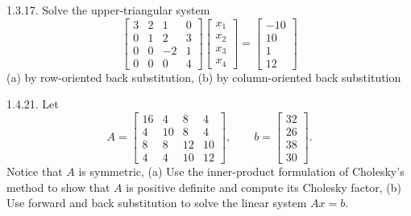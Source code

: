 \documentclass{report}
\begin{document}
    \pagebreak \bigbreak \noindent 
    \begin{mdframed}
        1.3.17. Solve the upper-triangular system
        \[
            \begin{bmatrix}
                3 & 2 & 1 & 0 \\
                0 & 1 & 2 & 3 \\
                0 & 0 & -2 & 1 \\
                0 & 0 & 0 & 4
            \end{bmatrix}
            \begin{bmatrix}
                x_{1} \\
                x_{2} \\
                x_{3} \\
                x_{4}
            \end{bmatrix}
            =
            \begin{bmatrix}
                -10 \\
                10 \\
                1 \\
                12
            \end{bmatrix}
        \]
        (a) by row-oriented back substitution, (b) by column-oriented back substitution
    \end{mdframed}

    \pagebreak \bigbreak \noindent 
    \begin{mdframed}
        1.4.21.  Let
        \[
            A =
            \begin{bmatrix}
                16 & 4 & 8 & 4 \\
                4 & 10 & 8 & 4 \\
                8 & 8 & 12 & 10 \\
                4 & 4 & 10 & 12
            \end{bmatrix},
            \qquad
            b =
            \begin{bmatrix}
                32 \\
                26 \\
                38 \\
                30
            \end{bmatrix}.
        \]
        Notice that $A$ is symmetric, (a) Use the inner-product formulation of Cholesky's method to show that $A$ is positive definite and compute its Cholesky factor, (b) Use forward and back substitution to solve the linear system $Ax =b$. 
    \end{mdframed}
\end{document}
